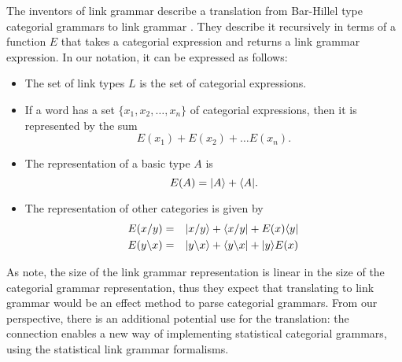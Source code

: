 \documentclass[12pt]{report}
\begin{document}
The inventors of link grammar describe a translation from Bar-Hillel type categorial grammars to link grammar \citep{Sleator:93}. They describe it recursively in terms of a function $E$ that takes a categorial expression and returns a link grammar expression. In our notation, it can be expressed as follows:
\begin{itemize}
\item The set of link types $L$ is the set of categorial expressions.
\item If a word has a set $\{x_1,x_2,\dots,x_n\}$ of categorial expressions, then it is represented by the sum
$$E(x_1)+E(x_2)+\ldots E(x_n).$$
\item The representation of a basic type $A$ is
$$E(A) = |A \rangle + \langle A|.$$
\item The representation of other categories is given by
\begin{eqnarray*}
E(x/y) &=& |x/y \rangle + \langle x/y| + E(x)\langle y|\\
E(y\backslash x) &=& |y\backslash x \rangle + \langle y\backslash x| + |y \rangle E(x)
\end{eqnarray*}
\end{itemize}
As \citeauthor{Sleator:93} note, the size of the link grammar representation is linear in the size of the categorial grammar representation, thus they expect that translating to link grammar would be an effect method to parse categorial grammars. From our perspective, there is an additional potential use for the translation: the connection enables a new way of implementing statistical categorial grammars, using the statistical link grammar formalisms.






\end{document}
